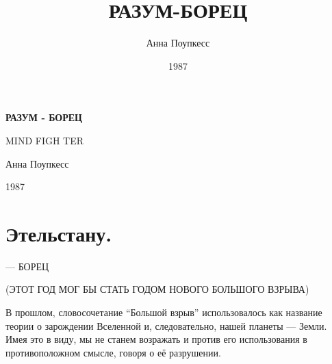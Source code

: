 \documentclass[a5paper, 9pt,
final, openany, twoside=true]{memoir}
\title{РАЗУМ-БОРЕЦ}
\author{Анна Поупкесс}
\date{1987}
\begin{document}
\thispagestyle{empty}
\vspace*{8\baselineskip}

{\centering\sffamily\bfseries\fontsize{32}{0}\selectfont
    РАЗУМ - БОРЕЦ\\
}

{\centering\sffamily\fontsize{18}{20}\selectfont
    M\space I\space N\space D\space 
    F\space I\space G\space H\space 
    T\space E\space R\\
}

{\centering\rmfamily\fontsize{12}{80}\selectfont
    Анна Поупкесс\\
}

{\centering\rmfamily\fontsize{12}{0}\selectfont\vspace{\fill}
    1987\\
}

\newpage{}

\vspace*{2\baselineskip}
\begin{center}
    \begin{KeepFromToc}
        \tableofcontents
    \end{KeepFromToc}
\end{center}
\thispagestyle{empty}
\chapter*{\vspace{5\baselineskip}\Huge{} Этельстану.}

\thispagestyle{empty}

\newpage

\vspace*{5\baselineskip}

\setcounter{page}{1}

\begin{center}
 — БОРЕЦ\bigskip

\noindent(ЭТОТ ГОД МОГ БЫ СТАТЬ ГОДОМ НОВОГО БОЛЬШОГО ВЗРЫВА)
\end{center}

В прошлом, словосочетание ``Большой взрыв'' использовалось как название теории о зарождении Вселенной и, следовательно, нашей планеты — Земли. Имея это в виду, мы не станем возражать и против его использования в противоположном смысле, говоря о её разрушении.\bigskip
\end{document}

